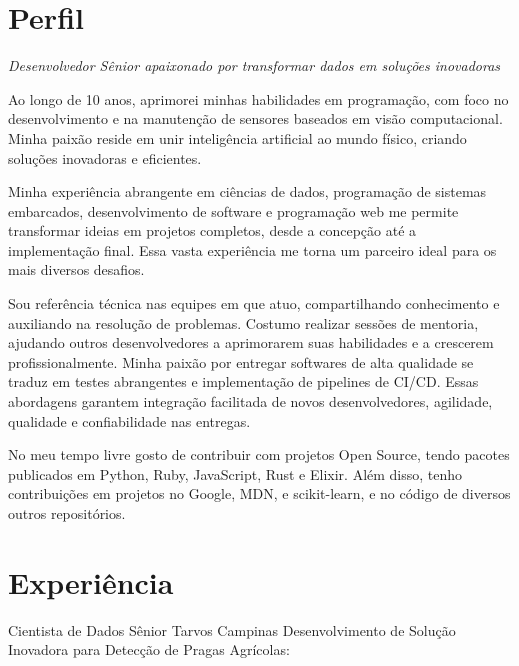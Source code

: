 \documentclass[11pt,a4paper,sans]{moderncv}        %
\begin{document}
\makecvtitle

\section{Perfil}

\setlength{\parskip}{0.5em}
\textit {Desenvolvedor Sênior apaixonado por transformar dados em soluções inovadoras} \par
\setlength{\parindent}{2em}

Ao longo de 10 anos, aprimorei minhas habilidades em programação, com foco no desenvolvimento e na manutenção de sensores baseados em visão computacional. Minha paixão reside em unir inteligência artificial ao mundo físico, criando soluções inovadoras e eficientes.

Minha experiência abrangente em ciências de dados, programação de sistemas embarcados, desenvolvimento de software e programação web me permite transformar ideias em projetos completos, desde a concepção até a implementação final. Essa vasta experiência me torna um parceiro ideal para os mais diversos desafios.

Sou referência técnica nas equipes em que atuo, compartilhando conhecimento e auxiliando na resolução de problemas. Costumo realizar sessões de mentoria, ajudando outros desenvolvedores a aprimorarem suas habilidades e a crescerem profissionalmente. Minha paixão por entregar softwares de alta qualidade se traduz em testes abrangentes e implementação de pipelines de CI/CD. Essas abordagens garantem integração facilitada de novos desenvolvedores, agilidade, qualidade e confiabilidade nas entregas.

No meu tempo livre gosto de contribuir com projetos Open Source, tendo pacotes publicados em Python, Ruby, JavaScript, Rust e Elixir. Além disso, tenho contribuições em projetos no Google, MDN, e scikit-learn, e no código de diversos outros repositórios.
\setlength{\parindent}{0em}

\section{Experiência}
{Cientista de Dados Sênior}
{Tarvos}
{Campinas}{}
{Desenvolvimento de Solução Inovadora para Detecção de Pragas Agrícolas:}
\end{document}
